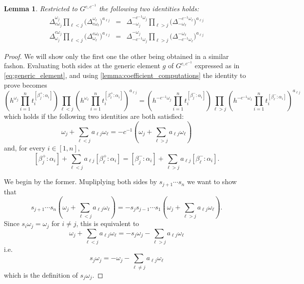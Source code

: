 \documentclass[11pt]{amsart}
\newtheorem{lemma}[theorem]{Lemma}
\numberwithin{equation}{section}
\begin{document}
\begin{lemma}
  Restricted to $G^{c,c^{-1}}$ the following two identities holds:
  \label{lemma:coefficients_identities}
  \begin{eqnarray}
    \Delta_{c\omega_j}^{\omega_j}
    \prod_{\ell<j}\big(\Delta_{c\omega_\ell}^{\omega_\ell}\big)^{a_{\ell j}}
    &=&
    \Delta_{-\omega_j}^{-c^{-1}\omega_j}
    \prod_{\ell>j}\big(\Delta_{-\omega_\ell}^{-c^{-1}\omega_\ell}\big)^{a_{\ell j}}\\
    \Delta_{\omega_j}^{c\omega_j}
    \prod_{\ell<j}\big(\Delta_{\omega_\ell}^{c\omega_\ell}\big)^{a_{\ell j}}
    &=&
    \Delta_{-c^{-1}\omega_j}^{-\omega_j}
    \prod_{\ell>j}\big(\Delta_{-c^{-1}\omega_\ell}^{-\omega_\ell}\big)^{a_{\ell j}}
  \end{eqnarray}
\end{lemma}
\begin{proof}
  We will show only the first one the other being obtained in a similar fashon.
  Evaluating both sides at the generic element $g$ of $G^{c,c^{-1}}$ expressed as in \cref{eq:generic_element}, and using \cref{lemma:coefficient_computations} the identity to prove becomes
  \[
    \left(h^{\omega_j}\prod_{i=1}^n t_{i}^{[\beta_j^+:\alpha_i]}\right)
    \prod_{\ell<j}\left(h^{\omega_\ell}\prod_{i=1}^n t_{i}^{[\beta_\ell^+:\alpha_i]}\right)^{a_{\ell j}}
    =
    \left(h^{-c^{-1}\omega_j}\prod_{i=1}^n t_{i}^{[\beta_j^-:\alpha_i]}\right)
    \prod_{\ell>j}\left(h^{-c^{-1}\omega_\ell}\prod_{i=1}^n t_{i}^{[\beta_\ell^-:\alpha_i]}\right)^{a_{\ell j}}
  \]
  which holds if the following two identities are both satisfied:
  \begin{equation}
    \omega_j + \sum_{\ell<j} a_{\ell j}\omega_\ell
    =
    -c^{-1}\left(\omega_j + \sum_{\ell>j} a_{\ell j}\omega_\ell\right)
  \end{equation}
  and, for every $i\in[1,n]$,
  \begin{equation}
    \label{eq:identity_betas}
    [\beta_j^+:\alpha_i]+\sum_{\ell<j}a_{\ell j}[\beta_\ell^+:\alpha_i]
    =
    [\beta_j^-:\alpha_i]+\sum_{\ell>j}a_{\ell j}[\beta_\ell^-:\alpha_i].
  \end{equation}

  We begin by the former. 
  Mupliplying both sides by $s_{j+1}\cdots s_n$ we want to show that
  \[
    s_{j+1}\cdots s_n\left(\omega_j + \sum_{\ell<j} a_{\ell j}\omega_\ell\right)=
    -s_js_{j-1}\cdots s_1\left(\omega_j + \sum_{\ell>j} a_{\ell j}\omega_\ell\right).
  \]
  Since $s_i\omega_j=\omega_j$ for $i\neq j$, this is equivalent to
  \[
    \omega_j + \sum_{\ell<j} a_{\ell j}\omega_\ell
    =
    -s_j\omega_j-\sum_{\ell>j} a_{\ell j}\omega_\ell
  \]
  i.e. 
  \begin{equation}
    s_j\omega_j
    =
    -\omega_j-\sum_{\ell\neq j}a_{\ell j}\omega_\ell
  \end{equation}
  which is the definition of $s_j\omega_j$.


\end{proof}
\end{document}
